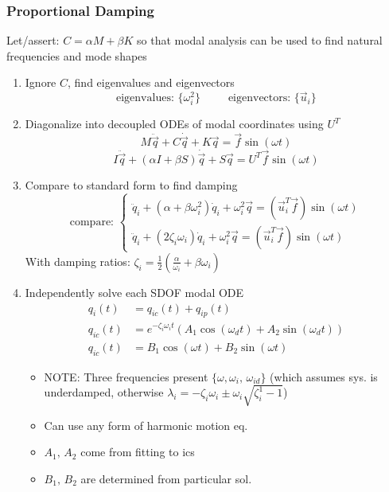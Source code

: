 \documentclass[twocolumn, 12pt]{article}    %
\begin{document}
\subsubsection*{Proportional Damping}
Let/assert:  \(C = \alpha M + \beta K\) so that modal analysis can be used to find natural frequencies and mode shapes
\begin{enumerate}
    \item Ignore \(C\), find eigenvalues and eigenvectors
    \begin{equation*}
        \text{eigenvalues: } \{\omega_i^2\}  \hspace{30pt}  \text{eigenvectors: } \{\Vec{u}_i\} 
    \end{equation*}

    \item Diagonalize into decoupled ODEs of modal coordinates using \(U^T\)
    \begin{equation*}
        M\ddot{\vec{q}} + C \dot{\vec{q}} + K \vec{q} = \vec{f} \sin (\omega t)
    \end{equation*}
    \begin{equation*}
        I \ddot{\vec{q}}  + (\alpha I + \beta S) \dot{\vec{q}} + S \vec{q} = U^T \vec{f} \sin (\omega t) 
    \end{equation*}

    \item Compare to standard form to find damping
    \begin{equation*}
        \text{compare: } \begin{cases}
            \ddot{q}_i + (\alpha + \beta \omega_i^2) \dot{q}_i + \omega_i^2\vec{q} = (\vec{u}_i^T\vec{f}) \sin (\omega t)\\
            \ddot{q}_i + (2\zeta_i \omega_i) \dot{q}_i + \omega_i^2\vec{q} = (\vec{u}_i^T\vec{f}) \sin (\omega t)
        \end{cases}
    \end{equation*}
    With damping ratios: \hspace{15pt}  \(\zeta_i = \frac{1}{2}\left(\frac{\alpha}{\omega_i} +\beta \omega_i \right)\)

    \item Independently solve each SDOF modal ODE
    \begin{align*}
        q_i(t) &= q_{ic}(t) + q_{ip}(t)\\
        q_{ic}(t) &= e^{-\zeta_i \omega_i t} (A_1 \cos (\omega_d t) + A_2 \sin (\omega_d t)) \\
        q_{ic}(t) &= B_1 \cos (\omega t) + B_2 \sin (\omega  t)
    \end{align*}
    \begin{itemize}
        \item NOTE: Three frequencies present \(\{\omega, \omega_i, \, \omega_{id}\} \) (which assumes sys. is underdamped, otherwise \(\lambda_i = -\zeta_i\omega_i \pm \omega_i \sqrt{\zeta_i^1-1}\))
        \item Can use any form of harmonic motion eq. 
        \item \(A_1,\,A_2\) come from fitting to ics
        \item \(B_1,\,B_2\) are determined from particular sol.
    \end{itemize}


\end{enumerate}
\end{document}
